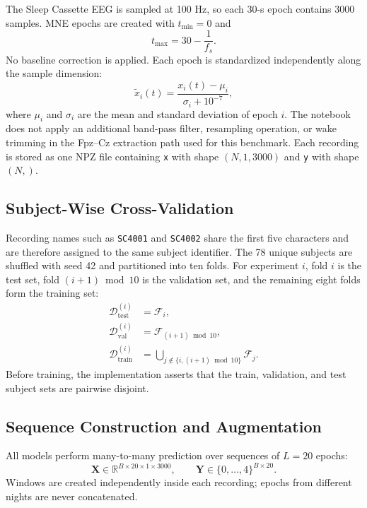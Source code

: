 \documentclass[conference]{IEEEtran}
\begin{document}
The Sleep Cassette EEG is sampled at 100 Hz, so each 30-s epoch contains 3000 samples. MNE epochs are created with $t_{\min}=0$ and
\begin{equation}
t_{\max}=30-\frac{1}{f_s}.
\end{equation}
No baseline correction is applied. Each epoch is standardized independently along the sample dimension:
\begin{equation}
\widetilde{x}_{i}(t)=
\frac{x_i(t)-\mu_i}{\sigma_i+10^{-7}},
\end{equation}
where $\mu_i$ and $\sigma_i$ are the mean and standard deviation of epoch $i$. The notebook does not apply an additional band-pass filter, resampling operation, or wake trimming in the Fpz--Cz extraction path used for this benchmark. Each recording is stored as one NPZ file containing \texttt{x} with shape $(N,1,3000)$ and \texttt{y} with shape $(N,)$.

\subsection{Subject-Wise Cross-Validation}

Recording names such as \texttt{SC4001} and \texttt{SC4002} share the first five characters and are therefore assigned to the same subject identifier. The 78 unique subjects are shuffled with seed 42 and partitioned into ten folds. For experiment $i$, fold $i$ is the test set, fold $(i+1)\bmod10$ is the validation set, and the remaining eight folds form the training set:
\begin{align}
\mathcal{D}^{(i)}_{\mathrm{test}} &= \mathcal{F}_{i},\\
\mathcal{D}^{(i)}_{\mathrm{val}} &= \mathcal{F}_{(i+1)\bmod 10},\\
\mathcal{D}^{(i)}_{\mathrm{train}} &=
\bigcup_{j\notin\{i,(i+1)\bmod10\}}\mathcal{F}_{j}.
\end{align}
Before training, the implementation asserts that the train, validation, and test subject sets are pairwise disjoint.

\subsection{Sequence Construction and Augmentation}

All models perform many-to-many prediction over sequences of $L=20$ epochs:
\begin{equation}
\mathbf{X}\in\mathbb{R}^{B\times20\times1\times3000},
\qquad
\mathbf{Y}\in\{0,\ldots,4\}^{B\times20}.
\end{equation}
Windows are created independently inside each recording; epochs from different nights are never concatenated.
\end{document}
